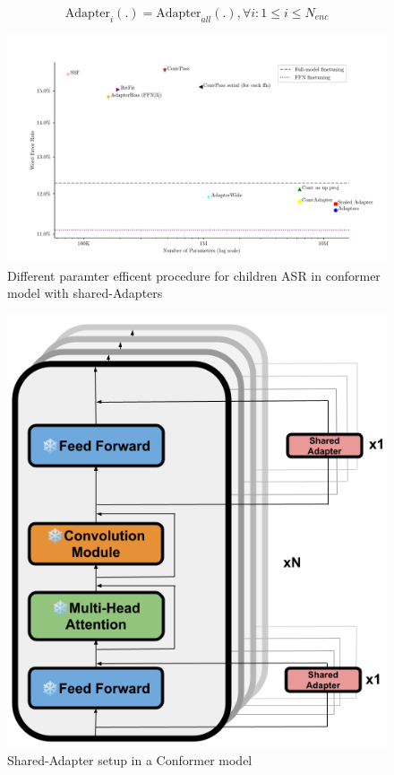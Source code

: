 \begin{equation}
    \text{Adapter}_{i}(.) = \text{Adapter}_{all}(.) , \forall i: 1 \leq i \leq N_{enc}
\end{equation}


\begin{figure}
    \begin{center}
        \includegraphics[width=\textwidth]{imgs/Adapters_compare.png}
        \caption{Different paramter efficent procedure for children ASR in conformer model with shared-Adapters}
        \label{fig:adapter_compared}
    \end{center}
\end{figure}
\begin{figure}
    \begin{center}
        \includegraphics[scale=0.3]{imgs/Shared_Adapters.png}
        \caption{Shared-Adapter setup in a Conformer model}
        \label{fig:Shared_adapter}
    \end{center}
\end{figure}


